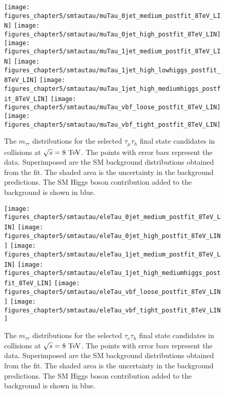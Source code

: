 \begin{figure}[htbp]
\centering
\texttt{[image: figures\_chapter5/smtautau/muTau\_0jet\_medium\_postfit\_8TeV\_LIN]}
\texttt{[image: figures\_chapter5/smtautau/muTau\_0jet\_high\_postfit\_8TeV\_LIN]}
\texttt{[image: figures\_chapter5/smtautau/muTau\_1jet\_medium\_postfit\_8TeV\_LIN]}
\texttt{[image: figures\_chapter5/smtautau/muTau\_1jet\_high\_lowhiggs\_postfit\_8TeV\_LIN]}
\texttt{[image: figures\_chapter5/smtautau/muTau\_1jet\_high\_mediumhiggs\_postfit\_8TeV\_LIN]}
\texttt{[image: figures\_chapter5/smtautau/muTau\_vbf\_loose\_postfit\_8TeV\_LIN]}
\texttt{[image: figures\_chapter5/smtautau/muTau\_vbf\_tight\_postfit\_8TeV\_LIN]}
\caption{The $m_{\tau\tau}$ distributions for the selected $\tau_{\mu}\tau_{h}$ final state candidates in collisions at $\sqrt{s}=8~\mathrm{Te\kern -0.1em V}$. The points with error bars represent the data. Superimposed are the SM background distributions obtained from the fit. The shaded area is the uncertainty in the background predictions. The SM Higgs boson contribution added to the background is shown in blue.}
\label{fig:mtau}
\end{figure}

\begin{figure}[htbp]
\centering
\texttt{[image: figures\_chapter5/smtautau/eleTau\_0jet\_medium\_postfit\_8TeV\_LIN]}
\texttt{[image: figures\_chapter5/smtautau/eleTau\_0jet\_high\_postfit\_8TeV\_LIN]}
\texttt{[image: figures\_chapter5/smtautau/eleTau\_1jet\_medium\_postfit\_8TeV\_LIN]}
\texttt{[image: figures\_chapter5/smtautau/eleTau\_1jet\_high\_mediumhiggs\_postfit\_8TeV\_LIN]}
\texttt{[image: figures\_chapter5/smtautau/eleTau\_vbf\_loose\_postfit\_8TeV\_LIN]}
\texttt{[image: figures\_chapter5/smtautau/eleTau\_vbf\_tight\_postfit\_8TeV\_LIN]}
\caption{The $m_{\tau\tau}$ distributions for the selected $\tau_{e}\tau_{h}$ final state candidates in collisions at $\sqrt{s}=8~\mathrm{Te\kern -0.1em V}$. The points with error bars represent the data. Superimposed are the SM background distributions obtained from the fit. The shaded area is the uncertainty in the background predictions. The SM Higgs boson contribution added to the background is shown in blue.}
\label{fig:etau}
\end{figure}

